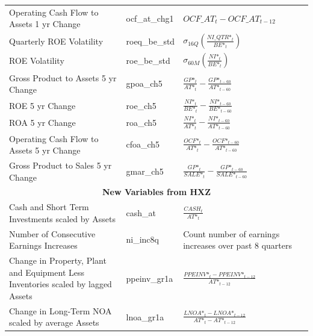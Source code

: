 \documentclass[12pt,title,fleqn]{article}
\begin{document}
{\begin{longtable}{@{\extracolsep{\fill}}|p{6cm}|l|p{8cm}|@{}}
    Operating Cash Flow to Assets 1 yr Change  & ocf\_at\_chg1 &$OCF\_AT_t - OCF\_AT_{t-12}$ \\
    
    Quarterly ROE Volatility & roeq\_be\_std & $\sigma_{16Q}\left(\frac{NI\_QTR\mbox{*}_t}{BE\mbox{*}_t}\right)$ \\
    
    ROE Volatility & roe\_be\_std & $\sigma_{60M}\left(\frac{NI\mbox{*}_t}{BE\mbox{*}_t}\right)$ \\  
    
    Gross Product to Assets 5 yr Change & gpoa\_ch5 & $\frac{GP\mbox{*}_t}{AT\mbox{*}_t} - \frac{GP\mbox{*}_{t-60}}{AT\mbox{*}_{t-60}}$ \\
    
    ROE 5 yr Change & roe\_ch5 & $\frac{NI\mbox{*}_t}{BE\mbox{*}_t} - \frac{NI\mbox{*}_{t-60}}{BE\mbox{*}_{t-60}}$ \\
    
    ROA 5 yr Change & roa\_ch5 & $\frac{NI\mbox{*}_t}{AT\mbox{*}_t} - \frac{NI\mbox{*}_{t-60}}{AT\mbox{*}_{t-60}}$\\
    
    Operating Cash Flow to Assets 5 yr Change & cfoa\_ch5 & $\frac{OCF\mbox{*}_t}{AT\mbox{*}_t} - \frac{OCF\mbox{*}_{t-60}}{AT\mbox{*}_{t-60}}$\\
    
    Gross Product to Sales 5 yr Change & gmar\_ch5 & $\frac{GP\mbox{*}_t}{SALE\mbox{*}_t} - \frac{GP\mbox{*}_{t-60}}{SALE\mbox{*}_{t-60}}$\\
	
    \hline 
	\multicolumn{3}{|c|}{\textbf{New Variables from HXZ}} \\
	\hline 		
	
    Cash and Short Term Investments scaled by Assets & cash\_at &$\frac{CASH_t}{AT\mbox{*}_t}$ \\
	
	Number of Consecutive Earnings Increases & ni\_inc8q &
	Count number of earnings increases over past 8 quarters \\
	
	Change in Property, Plant and Equipment Less Inventories scaled by lagged Assets & ppeinv\_gr1a &$\frac{PPEINV\mbox{*}_t - PPEINV\mbox{*}_{t-12}}{AT\mbox{*}_{t-12}}$\\
	
	Change in Long-Term NOA scaled by average Assets & lnoa\_gr1a & $ \frac{LNOA\mbox{*}_t - LNOA\mbox{*}_{t-12}}{AT\mbox{*}_t - AT\mbox{*}_{t-12}}$\\
	

\end{longtable}}
\end{document}
